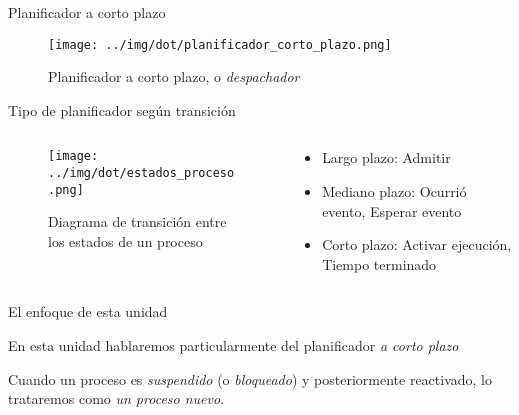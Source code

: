 \documentclass[presentation]{beamer}
\begin{document}
\begin{frame}[label={sec:org212e430}]{Planificador a corto plazo}
\begin{figure}[htbp]
\centering
\texttt{[image: ../img/dot/planificador\_corto\_plazo.png]}
\caption{Planificador a corto plazo, o \emph{despachador}}
\end{figure}
\end{frame}

\begin{frame}[label={sec:org6ea3529}]{Tipo de planificador según transición}
\begin{columns}\begin{column}{0.6\textwidth}
\begin{figure}[htbp]
\centering
\texttt{[image: ../img/dot/estados\_proceso.png]}
\caption{Diagrama de transición entre los estados de un proceso}
\end{figure}
\end{column} \begin{column}{0.4\textwidth}
\begin{itemize}
\item \alert{Largo plazo}: Admitir
\item \alert{Mediano plazo}: Ocurrió evento, Esperar evento
\item \alert{Corto plazo}: Activar ejecución, Tiempo terminado
\end{itemize}
\end{column}\end{columns}
\end{frame}

\begin{frame}[label={sec:org9144e00}]{El enfoque de esta unidad}
\begin{center}
En esta unidad hablaremos particularmente del planificador \emph{a corto
plazo}

Cuando un proceso es \emph{suspendido} (o \emph{bloqueado}) y posteriormente
reactivado, lo trataremos como \emph{un proceso nuevo}.
\end{center}
\end{frame}
\end{document}
